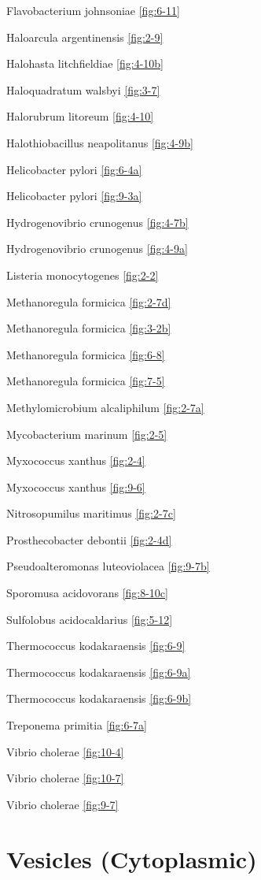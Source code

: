 \documentclass[]{tufte-book}
\begin{document}
Flavobacterium johnsoniae \ref{fig:6-11}

Haloarcula argentinensis \ref{fig:2-9}

Halohasta litchfieldiae \ref{fig:4-10b}

Haloquadratum walsbyi \ref{fig:3-7}

Halorubrum litoreum \ref{fig:4-10}

Halothiobacillus neapolitanus \ref{fig:4-9b}

Helicobacter pylori \ref{fig:6-4a}

Helicobacter pylori \ref{fig:9-3a}

Hydrogenovibrio crunogenus \ref{fig:4-7b}

Hydrogenovibrio crunogenus \ref{fig:4-9a}

Listeria monocytogenes \ref{fig:2-2}

Methanoregula formicica \ref{fig:2-7d}

Methanoregula formicica \ref{fig:3-2b}

Methanoregula formicica \ref{fig:6-8}

Methanoregula formicica \ref{fig:7-5}

Methylomicrobium alcaliphilum \ref{fig:2-7a}

Mycobacterium marinum \ref{fig:2-5}

Myxococcus xanthus \ref{fig:2-4}

Myxococcus xanthus \ref{fig:9-6}

Nitrosopumilus maritimus \ref{fig:2-7c}

Prosthecobacter debontii \ref{fig:2-4d}

Pseudoalteromonas luteoviolacea \ref{fig:9-7b}

Sporomusa acidovorans \ref{fig:8-10c}

Sulfolobus acidocaldarius \ref{fig:5-12}

Thermococcus kodakaraensis \ref{fig:6-9}

Thermococcus kodakaraensis \ref{fig:6-9a}

Thermococcus kodakaraensis \ref{fig:6-9b}

Treponema primitia \ref{fig:6-7a}

Vibrio cholerae \ref{fig:10-4}

Vibrio cholerae \ref{fig:10-7}

Vibrio cholerae \ref{fig:9-7}

\section*{Vesicles (Cytoplasmic)}\label{vesicles-cytoplasmic}
\end{document}

